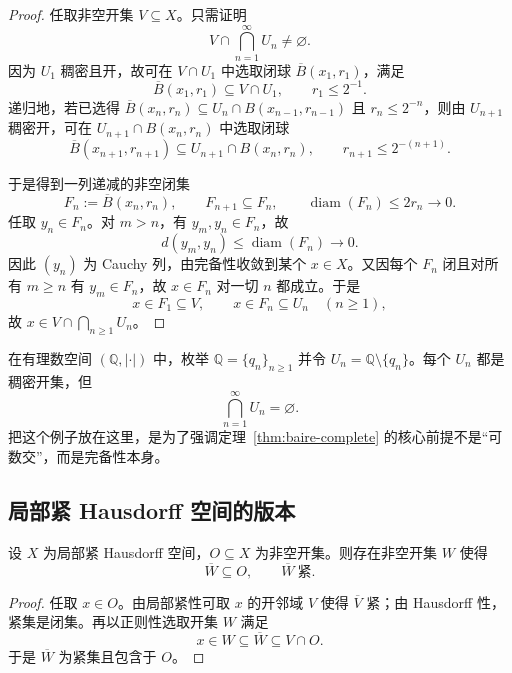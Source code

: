 \begin{proof}
任取非空开集 $V\subseteq X$。只需证明
\[
V\cap \bigcap_{n=1}^{\infty} U_n\neq \varnothing.
\]
因为 $U_1$ 稠密且开，故可在 $V\cap U_1$ 中选取闭球 $\overline{B}(x_1,r_1)$，满足
\[
\overline{B}(x_1,r_1)\subseteq V\cap U_1,\qquad r_1\le 2^{-1}.
\]
递归地，若已选得 $\overline{B}(x_n,r_n)\subseteq U_n\cap B(x_{n-1},r_{n-1})$ 且 $r_n\le 2^{-n}$，则由 $U_{n+1}$ 稠密开，可在 $U_{n+1}\cap B(x_n,r_n)$ 中选取闭球
\[
\overline{B}(x_{n+1},r_{n+1})\subseteq U_{n+1}\cap B(x_n,r_n),\qquad r_{n+1}\le 2^{-(n+1)}.
\]

于是得到一列递减的非空闭集
\[
F_n:=\overline{B}(x_n,r_n),\qquad F_{n+1}\subseteq F_n,\qquad \operatorname{diam}(F_n)\le 2r_n\to 0.
\]
任取 $y_n\in F_n$。对 $m>n$，有 $y_m,y_n\in F_n$，故
\[
d(y_m,y_n)\le \operatorname{diam}(F_n)\to 0.
\]
因此 $(y_n)$ 为 Cauchy 列，由完备性收敛到某个 $x\in X$。又因每个 $F_n$ 闭且对所有 $m\ge n$ 有 $y_m\in F_n$，故 $x\in F_n$ 对一切 $n$ 都成立。于是
\[
x\in F_1\subseteq V,\qquad x\in F_n\subseteq U_n\quad (n\ge 1),
\]
故 $x\in V\cap\bigcap_{n\ge 1}U_n$。
\end{proof}

\begin{example}[为什么完备性不能省略]\label{ex:baire-rationals}
在有理数空间 $(\mathbb Q,|\cdot|)$ 中，枚举 $\mathbb Q=\{q_n\}_{n\ge1}$ 并令 $U_n=\mathbb Q\setminus\{q_n\}$。每个 $U_n$ 都是稠密开集，但
\[
\bigcap_{n=1}^{\infty}U_n=\varnothing.
\]
把这个例子放在这里，是为了强调定理~\ref{thm:baire-complete} 的核心前提不是“可数交”，而是完备性本身。
\end{example}

\subsection{局部紧 Hausdorff 空间的版本}

\begin{lemma}\label{lem:locally-compact-open}
设 $X$ 为局部紧 Hausdorff 空间，$O\subseteq X$ 为非空开集。则存在非空开集 $W$ 使得
\[
\overline{W}\subseteq O,\qquad \overline{W}\ \text{紧}.
\]
\end{lemma}

\begin{proof}
任取 $x\in O$。由局部紧性可取 $x$ 的开邻域 $V$ 使得 $\overline{V}$ 紧；由 Hausdorff 性，紧集是闭集。再以正则性选取开集 $W$ 满足
\[
x\in W\subseteq \overline{W}\subseteq V\cap O.
\]
于是 $\overline{W}$ 为紧集且包含于 $O$。
\end{proof}

